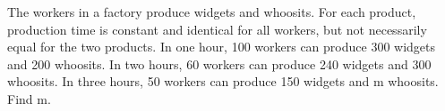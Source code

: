 The workers in a factory produce widgets and whoosits. For each product, production time is constant and identical for all workers, but not necessarily equal for the two products. In one hour, 100 workers can produce 300 widgets and 200 whoosits. In two hours, 60 workers can produce 240 widgets and 300 whoosits. In three hours, 50 workers can produce 150 widgets and m whoosits. Find m.